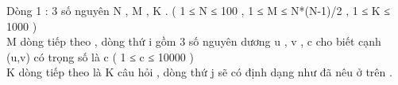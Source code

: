 Dòng 1 : 3 số nguyên N , M , K . ( 1 ≤ N ≤ 100 , 1 ≤ M ≤ N*(N-1)/2  , 1 ≤ K ≤ 1000 )   
\\   M dòng tiếp theo , dòng thứ i gồm 3 số nguyên dương u , v , c cho biết cạnh (u,v) có trọng số là c ( 1 ≤ c ≤ 10000 )   
\\   K dòng tiếp theo là K câu hỏi , dòng thứ j sẽ có định dạng như đã nêu ở trên .   
\\

\